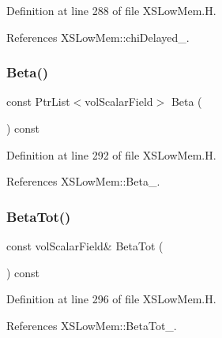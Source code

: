Definition at line 288 of file X\+S\+Low\+Mem.\+H.



References X\+S\+Low\+Mem\+::chi\+Delayed\+\_\+.

\mbox{\label{classFoam_1_1XSLowMem_a18490f453da25d7d0de6e64d27566fe5}} 
\subsubsection{\texorpdfstring{Beta()}{Beta()}}
{\footnotesize\ttfamily const Ptr\+List$<$vol\+Scalar\+Field$>$ Beta (\begin{DoxyParamCaption}{ }\end{DoxyParamCaption}) const\hspace{0.3cm}{\ttfamily [inline]}}



Definition at line 292 of file X\+S\+Low\+Mem.\+H.



References X\+S\+Low\+Mem\+::\+Beta\+\_\+.

\mbox{\label{classFoam_1_1XSLowMem_a8da9750eb290754d0fdf9fdadcb33912}} 
\subsubsection{\texorpdfstring{Beta\+Tot()}{BetaTot()}}
{\footnotesize\ttfamily const vol\+Scalar\+Field\& Beta\+Tot (\begin{DoxyParamCaption}{ }\end{DoxyParamCaption}) const\hspace{0.3cm}{\ttfamily [inline]}}



Definition at line 296 of file X\+S\+Low\+Mem.\+H.



References X\+S\+Low\+Mem\+::\+Beta\+Tot\+\_\+.

\mbox{\label{classFoam_1_1XSLowMem_a9fe5da186e1af8ac5b1a3adff2686609}} 
